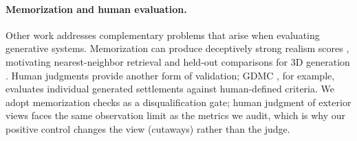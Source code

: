 \paragraph{Memorization and human evaluation.} Other work addresses complementary problems that arise when evaluating generative systems. Memorization can produce deceptively strong realism scores \citep{carlini2023extracting,bai2021gamedfid}, motivating nearest-neighbor retrieval and held-out comparisons for 3D generation \citep{pu2025memorization,meehan2020datacopying}. Human judgments provide another form of validation; GDMC \citep{salge2018gdmc}, for example, evaluates individual generated settlements against human-defined criteria. We adopt memorization checks as a disqualification gate; human judgment of exterior views faces the same observation limit as the metrics we audit, which is why our positive control changes the view (cutaways) rather than the judge.

